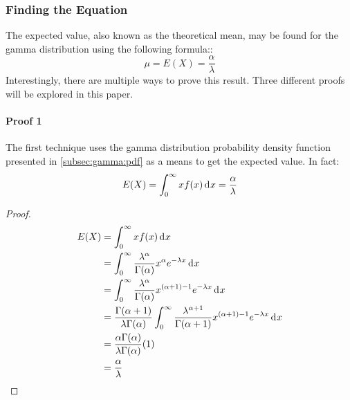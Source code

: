 \documentclass[12pt]{article}
\begin{document}
\subsubsection{Finding the Equation}
The expected value, also known as the theoretical mean, may be found for the gamma distribution using the following
formula::
\begin{equation}
	\mu = E(X) = \frac{\alpha}{\lambda}
\end{equation}
Interestingly, there are multiple ways to prove this result. Three different proofs will be explored in this paper.

\paragraph{Proof 1}\label{par:gamma:expected:proof1}
The first technique uses the gamma distribution probability density function presented in \autoref{subsec:gamma:pdf} as
a means to get the expected value. In fact:
\begin{equation}\label{eq:gamma:expected:proof1}
	E(X) = \int^\infty_0 xf(x)\mathop{}\!\mathrm{d^{}}x = \frac{\alpha}{\lambda}
\end{equation}
\begin{proof}
	\begin{equation}
		\begin{split}
			E(X)	&=	\int^\infty_0 xf(x)\mathop{}\!\mathrm{d^{}}x\\
					&=	\int^\infty_0 \frac{\lambda^\alpha}{\Gamma(\alpha)}x^\alpha e^{-\lambda x}\mathop{}\!\mathrm{d^{}}x\\
					&=	\int^\infty_0 \frac{\lambda^\alpha}{\Gamma(\alpha)}x^{(\alpha+1)-1} e^{-\lambda x}\mathop{}\!\mathrm{d^{}}x\\
					&=	\frac{\Gamma(\alpha+1)}{\lambda\Gamma(\alpha)}\int^\infty_0 \frac{\lambda^{\alpha+1}}{\Gamma(\alpha+1)}x^{(\alpha+1)-1} e^{-\lambda x}\mathop{}\!\mathrm{d^{}}x\\
					&=	\frac{\alpha\Gamma(\alpha)}{\lambda\Gamma(\alpha)}(1)\\
					&=	\frac{\alpha}{\lambda}
		\end{split}
	\end{equation}
\end{proof}
\end{document}
